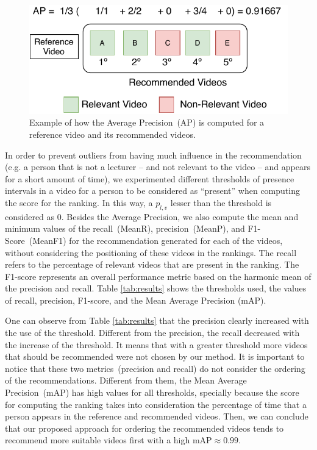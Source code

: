 \begin{figure}[ht]
  \centering
  \includegraphics[width=0.7\linewidth]{img/video_recommendation/ap_example.pdf}
  \caption{Example of how the Average Precision~(AP) is computed for a reference video and its recommended videos.}
  \label{fig:ap_example}
\end{figure}

In order to prevent outliers from having much influence in the recommendation (e.g. a person that is not a lecturer -- and not relevant to the video -- and appears for a short amount of time), we experimented different thresholds of presence intervals in a video for a person to be considered as ``present'' when computing the score for the ranking. 
In this way, a $p_{l,v}$ lesser than the threshold is considered as $0$.
Besides the Average Precision, we also compute the mean and minimum values of the recall~(MeanR), precision~(MeanP), and F1-Score~(MeanF1) for the recommendation generated for each of the videos, without considering the positioning of these videos in the rankings.
The recall refers to the percentage of relevant videos that are present in the ranking.
The F1-score represents an overall performance metric based on the  harmonic mean of the precision and recall.
Table \ref{tab:results} shows the thresholds used, the values of recall, precision, F1-score, and the Mean Average Precision (mAP).

One can observe from Table \ref{tab:results} that the precision clearly increased with the use of the threshold.
Different from the precision, the recall decreased with the increase of the threshold. It means that with a greater threshold more videos that should be recommended were not chosen by our method.
It is important to notice that these two metrics~(precision and recall) do not consider the ordering of the recommendations.
Different from them, the Mean Average Precision~(mAP) has high values for all thresholds, specially because the score for computing the ranking takes into consideration the percentage of time that a person appears in the reference and recommended videos.
Then, we can conclude that our proposed approach for ordering the recommended videos tends to recommend more suitable videos first with a high mAP$\approx0.99$. 


